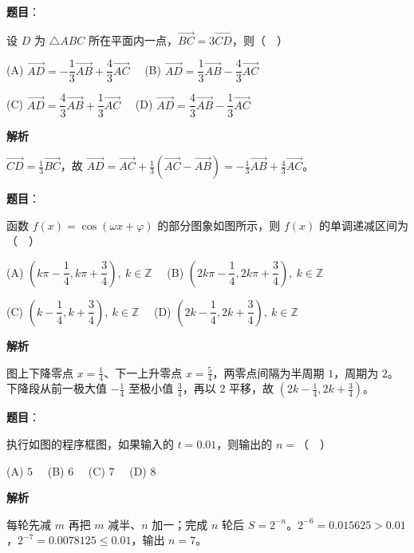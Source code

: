 \begin{answer}

\textbf{题目}：

设 $D$ 为 $\triangle ABC$ 所在平面内一点，$\overrightarrow{BC}=3\overrightarrow{CD}$，则（　）

(A) $\overrightarrow{AD}=-\dfrac13\overrightarrow{AB}+\dfrac43\overrightarrow{AC}$　 (B) $\overrightarrow{AD}=\dfrac13\overrightarrow{AB}-\dfrac43\overrightarrow{AC}$

(C) $\overrightarrow{AD}=\dfrac43\overrightarrow{AB}+\dfrac13\overrightarrow{AC}$　 (D) $\overrightarrow{AD}=\dfrac43\overrightarrow{AB}-\dfrac13\overrightarrow{AC}$

\textbf{解析}

$\overrightarrow{CD}=\tfrac13\overrightarrow{BC}$，故 $\overrightarrow{AD}=\overrightarrow{AC}+\tfrac13(\overrightarrow{AC}-\overrightarrow{AB})=-\tfrac13\overrightarrow{AB}+\tfrac43\overrightarrow{AC}$。


\end{answer}
\begin{answer}

\textbf{题目}：

函数 $f(x)=\cos(\omega x+\varphi)$ 的部分图象如图所示，则 $f(x)$ 的单调递减区间为（　）
\nopagebreak[4]
\begin{center}\end{center}
\nopagebreak[4]
(A) $\left(k\pi-\dfrac14,k\pi+\dfrac34\right),\ k\in\mathbb Z$　 (B) $\left(2k\pi-\dfrac14,2k\pi+\dfrac34\right),\ k\in\mathbb Z$

(C) $\left(k-\dfrac14,k+\dfrac34\right),\ k\in\mathbb Z$　 (D) $\left(2k-\dfrac14,2k+\dfrac34\right),\ k\in\mathbb Z$

\textbf{解析}

图上下降零点 $x=\tfrac14$、下一上升零点 $x=\tfrac54$，两零点间隔为半周期 $1$，周期为 $2$。下降段从前一极大值 $-\tfrac14$ 至极小值 $\tfrac34$，再以 $2$ 平移，故 $\left(2k-\tfrac14,2k+\tfrac34\right)$。


\end{answer}
\begin{answer}

\textbf{题目}：

执行如图的程序框图，如果输入的 $t=0.01$，则输出的 $n=$（　）
\nopagebreak[4]
\begin{center}\end{center}
\nopagebreak[4]
(A) $5$　 (B) $6$　 (C) $7$　 (D) $8$

\textbf{解析}

每轮先减 $m$ 再把 $m$ 减半、$n$ 加一；完成 $n$ 轮后 $S=2^{-n}$。$2^{-6}=0.015625>0.01$，$2^{-7}=0.0078125\leqslant0.01$，输出 $n=7$。


\end{answer}
